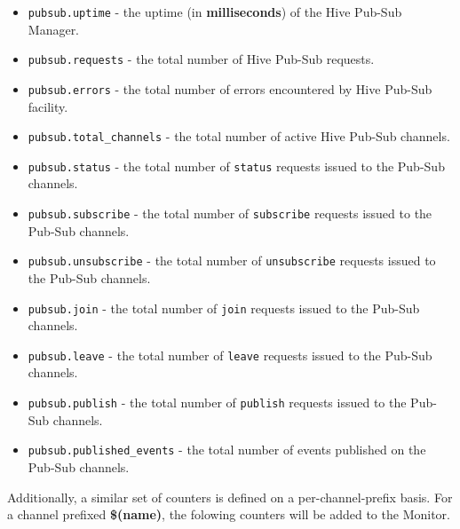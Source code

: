 \documentclass[a4paper]{article}
\begin{document}
\begin{itemize}
\item \texttt{pubsub.uptime} - the uptime (in \textbf{milliseconds}) of the Hive Pub-Sub Manager.
\item \texttt{pubsub.requests} - the total number of Hive Pub-Sub requests.
\item \texttt{pubsub.errors} - the total number of errors encountered by Hive Pub-Sub facility.
\item \texttt{pubsub.total\_channels} - the total number of active Hive Pub-Sub channels.
\item \texttt{pubsub.status} - the total number of \texttt{status} requests issued to the Pub-Sub channels.
\item \texttt{pubsub.subscribe} - the total number of \texttt{subscribe} requests issued to the Pub-Sub channels.
\item \texttt{pubsub.unsubscribe} - the total number of \texttt{unsubscribe} requests issued to the Pub-Sub channels.
\item \texttt{pubsub.join} - the total number of \texttt{join} requests issued to the Pub-Sub channels.
\item \texttt{pubsub.leave} - the total number of \texttt{leave} requests issued to the Pub-Sub channels.
\item \texttt{pubsub.publish} - the total number of \texttt{publish} requests issued to the Pub-Sub channels.
\item \texttt{pubsub.published\_events} - the total number of events published on the Pub-Sub channels.
\end{itemize}

\noindent
Additionally, a similar set of counters is defined on a per-channel-prefix basis. For a channel prefixed \textbf{\$(name)}, the folowing counters will be added to the Monitor.
\end{document}
